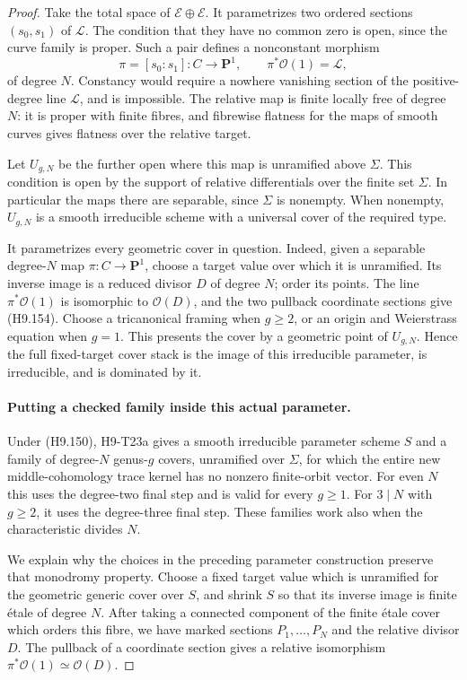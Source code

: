 \begin{proof}
Take the total space of $\mathcal E\oplus\mathcal E$.
It parametrizes two ordered sections $(s_0,s_1)$ of
$\mathcal L$. The condition that they have no common
zero is open, since the curve family is proper.
Such a pair defines a nonconstant morphism
\[
                        \pi=[s_0:s_1]:C\to\mathbf P^1,
                               \qquad \pi^*\mathcal O(1)=\mathcal L,
                                                               \tag{H9.154}
\]
of degree $N$. Constancy would require a nowhere
vanishing section of the positive-degree line
$\mathcal L$, and is impossible. The relative map
is finite locally free of degree $N$: it is proper
with finite fibres, and fibrewise flatness for the
maps of smooth curves gives flatness over the
relative target.

Let $U_{g,N}$ be the further open where this map
is unramified above $\Sigma$. This condition is
open by the support of relative differentials
over the finite set $\Sigma$. In particular the
maps there are separable, since $\Sigma$ is nonempty.
When nonempty, $U_{g,N}$ is a smooth irreducible
scheme with a universal cover of the required type.

It parametrizes every geometric cover in question.
Indeed, given a separable degree-$N$ map
$\pi:C\to\mathbf P^1$, choose a target value over
which it is unramified. Its inverse image is a
reduced divisor $D$ of degree $N$; order its points.
The line $\pi^*\mathcal O(1)$ is isomorphic to
$\mathcal O(D)$, and the two pullback coordinate
sections give (H9.154). Choose a tricanonical
framing when $g\ge2$, or an origin and Weierstrass
equation when $g=1$. This presents the cover by a
geometric point of $U_{g,N}$. Hence the full
fixed-target cover stack is the image of this
irreducible parameter, is irreducible, and is
dominated by it.

\paragraph{Putting a checked family inside this actual parameter.}
Under (H9.150), H9-T23a gives a smooth irreducible
parameter scheme $S$ and a family of degree-$N$
genus-$g$ covers, unramified over $\Sigma$, for
which the entire new middle-cohomology trace
kernel has no nonzero finite-orbit vector.
For even $N$ this uses the degree-two final step
and is valid for every $g\ge1$. For $3\mid N$
with $g\ge2$, it uses the degree-three final step.
These families work also when the characteristic
divides $N$.

We explain why the choices in the preceding
parameter construction preserve that monodromy
property. Choose a fixed target value which is
unramified for the geometric generic cover over
$S$, and shrink $S$ so that its inverse image is
finite \'etale of degree $N$. After taking a
connected component of the finite \'etale cover
which orders this fibre, we have marked sections
$P_1,\ldots,P_N$ and the relative divisor $D$.
The pullback of a coordinate section gives a
relative isomorphism
$\pi^*\mathcal O(1)\simeq\mathcal O(D)$.


\end{proof}
